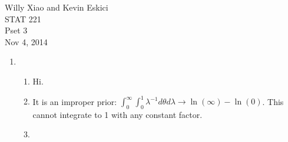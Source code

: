 \documentclass[paper=a4, fontsize=11pt]{scrartcl}
\begin{document}
\noindent Willy Xiao and Kevin Eskici \\ STAT 221 \\Pset 3\\ Nov 4, 2014
\begin{enumerate}
  \item
    \begin{enumerate}[1]
      \item Hi.
      \item It is an improper prior: $\int_0^\infty{\int_0^1{\lambda^{-1}}}d\theta d\lambda \rightarrow \ln(\infty) - \ln(0)$. This cannot integrate to 1 with any constant factor.
	
	\item      
      
    \end{enumerate}
\end{enumerate}
\end{document}
